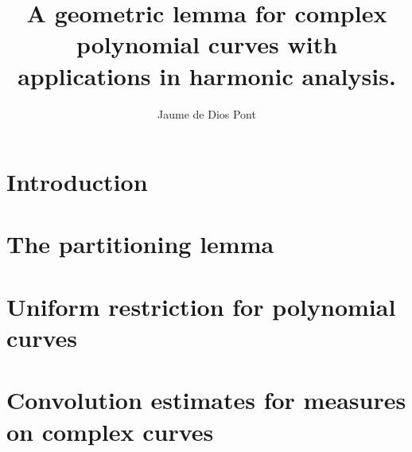 \documentclass{article}
\title{A geometric lemma for complex polynomial curves with applications in harmonic analysis.}
\author{Jaume de Dios Pont}
\begin{document}
	\maketitle

	\tableofcontents


	\newpage
	\section{Introduction} %
	\label{sec:introduction}
	


	\newpage
	\section{The partitioning lemma} %
	\label{sec:the_geometry}
	
	\newpage
	\section{Uniform restriction for polynomial curves} %
	\label{sec:the_analysis}
	

	\newpage
	\section{Convolution estimates for measures on complex curves} %
	\label{sec:convolution_estimates_for_measures_on_complex_curves}
	
\end{document}
